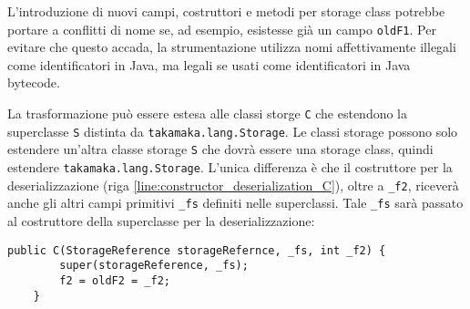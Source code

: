 L'introduzione di nuovi campi, costruttori e metodi per storage class potrebbe portare a conflitti di nome se, ad esempio, esistesse già un campo \lstinline|oldF1|. Per evitare che questo accada, la strumentazione utilizza nomi affettivamente illegali come identificatori in Java, ma legali se usati come identificatori in Java bytecode.

La trasformazione può essere estesa alle classi storge \lstinline|C| che estendono la superclasse \lstinline|S| distinta da \lstinline|takamaka.lang.Storage|. Le classi storage possono solo estendere un'altra classe storage \lstinline|S| che dovrà essere una storage class, quindi estendere \lstinline|takamaka.lang.Storage|. L'unica differenza è che il costruttore per la deserializzazione (riga \ref{line:constructor_deserialization_C}), oltre a \lstinline|_f2|, riceverà anche gli altri campi primitivi \lstinline|_fs| definiti nelle superclassi. Tale \lstinline|_fs| sarà passato al costruttore della superclasse per la deserializzazione:
%
\begin{lstlisting}[numbers=none,frame=none]
	public C(StorageReference storageRefernce, _fs, int _f2) {
		super(storageReference, _fs);
		f2 = oldF2 = _f2;
	}
\end{lstlisting}
%